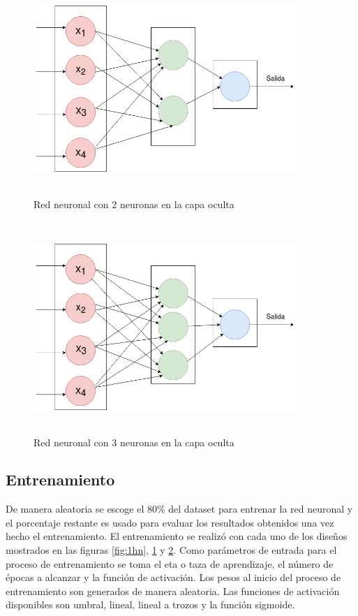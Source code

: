 \documentclass[11pt]{article}
\begin{document}
\begin{figure}[ht]
    \includegraphics[width=10cm, height=8cm]{2hn}
    \centering
    \caption{Red neuronal con 2 neuronas en la capa oculta}
    \label{fig:2hn}
\end{figure}
\begin{figure}[ht]
    \includegraphics[width=10cm, height=8cm]{3hn}
    \centering
    \caption{Red neuronal con 3 neuronas en la capa oculta}
    \label{fig:3hn}
\end{figure}
\subsection{Entrenamiento}
De manera aleatoria se escoge  el 80\% del dataset para entrenar la red neuronal y el porcentaje
restante es usado para evaluar los resultados obtenidos una vez hecho el entrenamiento.
El entrenamiento se realiz\'o con cada uno de los dise\~nos mostrados en las figuras \ref{fig:1hn}, \ref{fig:2hn} y \ref{fig:3hn}.
Como par\'ametros de entrada para el proceso de entrenamiento se toma el eta o taza de aprendizaje, el n\'umero de \'epocas a alcanzar y la funci\'on de activaci\'on.
Los pesos al inicio del proceso de entrenamiento son generados de manera aleatoria. Las funciones de activaci\'on disponibles son umbral, lineal, lineal a trozos y la función sigmoide.
\end{document}
